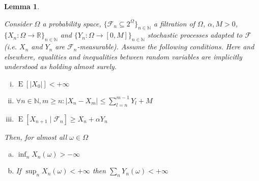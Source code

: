 \documentclass[aop,preprint]{imsart}
\numberwithin{equation}{section}
\theoremstyle{definition}
\theoremstyle{plain}
\newtheorem{lemma}{Lemma}[section]
\newcommand{\Nats}{\mathbb{N}}
\newcommand{\Reals}{\mathbb{R}}
\newcommand{\A}[1]{\lvert #1 \rvert}
\newcommand{\Sq}[2]{\{#1\}_{#2 \in \Nats}}
\newcommand{\Sqn}[1]{\Sq{#1}{n}}
\DeclareMathOperator{\E}{E}
\newcommand{\F}{\mathcal{F}}
\begin{document}
\begin{samepage}
\begin{lemma}
\label{lmm:prudent}

Consider $\Omega$ a probability space, $\Sqn{\F_n \subseteq 2^\Omega}$ a filtration of $\Omega$, $\alpha,M > 0$, $\Sqn{X_n: \Omega \rightarrow \Reals}$ and $\Sqn{Y_n: \Omega \rightarrow \left[0,M\right]}$ stochastic processes adapted to $\F$ (i.e. $X_n$ and $Y_n$ are $\F_n$-measurable). Assume the following conditions. Here and elsewhere, equalities and inequalities between random variables are implicitly understood as holding almost surely.

\begin{enumerate}[i.]

\item $\E\left[\A{X_0}\right] < +\infty$
\item $\forall n \in \Nats, m \geq n: \A{X_n - X_m} \leq \sum_{l=n}^{m-1} Y_l + M$
\item $\E\left[X_{n+1} \mid \F_n\right] \geq X_n + \alpha Y_n$

\end{enumerate}

Then, for almost all $\omega \in \Omega$

\begin{enumerate}[a.]

\item\label{itm:lmm_prudent__inf} $\inf_n X_n\left(\omega\right) > -\infty$
\item\label{itm:lmm_prudent__sup} If $\sup_n X_n\left(\omega\right) < +\infty$ then $\sum_n Y_n\left(\omega\right) < +\infty$

\end{enumerate}

\end{lemma}
\end{samepage}
\end{document}
